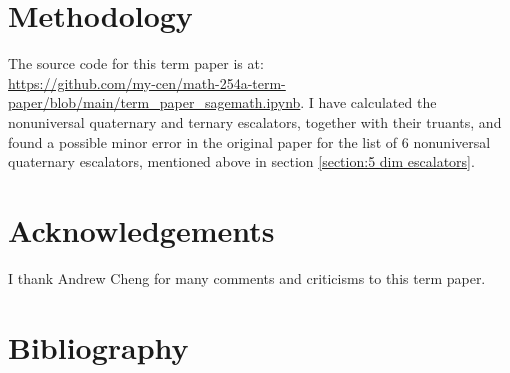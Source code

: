 \documentclass[letterpaper, 12pt]{article}
\begin{document}
\section{Methodology}
The source code for this term paper is at:\\\url{https://github.com/my-cen/math-254a-term-paper/blob/main/term_paper_sagemath.ipynb}.
I have calculated the nonuniversal quaternary and ternary escalators, together with their truants, and found a possible minor error in the original paper for the list of $6$ nonuniversal quaternary escalators, mentioned above in section \ref{section:5 dim escalators}.

\section{Acknowledgements}
I thank Andrew Cheng for many comments and criticisms to this term paper.
\fontsize{10}{12}\selectfont

\section{Bibliography}
\printbibliography[heading=none]

\end{document}
